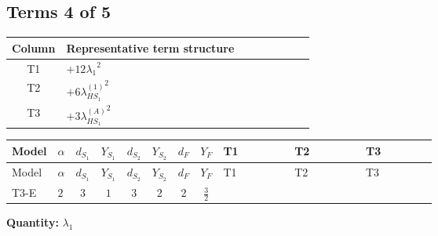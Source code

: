 \documentclass[8pt]{article}
\begin{document}
\begin{landscape}
\subsection*{Terms 4 of 5}
\begin{center}
\begin{tabular}{@{}c >{\raggedright\arraybackslash}p{0.82\linewidth}@{}}
\toprule
Column & Representative term structure \\
\midrule
T1 & \(\displaystyle +12 {\lambda_1}^2\) \\
\midrule
T2 & \(\displaystyle +6 {\lambda_{HS_1}^{(1)}}^2\) \\
\midrule
T3 & \(\displaystyle +3 {\lambda_{HS_1}^{(A)}}^2\) \\
\midrule
\bottomrule
\end{tabular}
\end{center}
\smallskip
\tiny
\begin{longtable}{@{}llcccccc >{\raggedright\arraybackslash}p{0.21\linewidth} >{\raggedright\arraybackslash}p{0.21\linewidth} >{\raggedright\arraybackslash}p{0.21\linewidth}@{}}
\toprule
Model & $\alpha$ & $d_{S_1}$ & $Y_{S_1}$ & $d_{S_2}$ & $Y_{S_2}$ & $d_F$ & $Y_F$ & T1 & T2 & T3 \\
\midrule
\endfirsthead
\toprule
Model & $\alpha$ & $d_{S_1}$ & $Y_{S_1}$ & $d_{S_2}$ & $Y_{S_2}$ & $d_F$ & $Y_F$ & T1 & T2 & T3 \\
\midrule
\endhead
T3-E & $2$ & $3$ & $1$ & $3$ & $2$ & $2$ & $\frac{3}{2}$ & \scriptsize\adjustbox{max width=\linewidth}{$\begin{gathered} +12 {\lambda_1}^2\end{gathered}$} & \scriptsize\adjustbox{max width=\linewidth}{$\begin{gathered} +6 {\lambda_{HS_1}^{(1)}}^2\end{gathered}$} & \scriptsize\adjustbox{max width=\linewidth}{$\begin{gathered} +3 {\lambda_{HS_1}^{(A)}}^2\end{gathered}$} \\
\midrule
\bottomrule
\end{longtable}
\clearpage
\noindent\textbf{Quantity: }$\lambda_1$\par\smallskip

\end{landscape}
\end{document}
